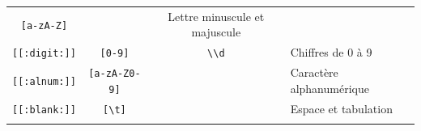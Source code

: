 \documentclass[
  11pt,
]{book}
\numberwithin{equation}{section}
\numberwithin{countremarque}{section}
\begin{document}
\begin{longtable}[]{@{}cccl@{}}
\begin{minipage}[t]{0.21\columnwidth}
\texttt{{[}a-zA-Z{]}}\strut
\end{minipage} & \begin{minipage}[t]{0.21\columnwidth}\centering
\strut
\end{minipage} & \begin{minipage}[t]{0.29\columnwidth}\raggedright
Lettre minuscule et majuscule\strut
\end{minipage}\tabularnewline
\begin{minipage}[t]{0.17\columnwidth}\centering
\texttt{{[}{[}:digit:{]}{]}}\strut
\end{minipage} & \begin{minipage}[t]{0.21\columnwidth}\centering
\texttt{{[}0-9{]}}\strut
\end{minipage} & \begin{minipage}[t]{0.21\columnwidth}\centering
\texttt{\textbackslash{}\textbackslash{}d}\strut
\end{minipage} & \begin{minipage}[t]{0.29\columnwidth}\raggedright
Chiffres de 0 à 9\strut
\end{minipage}\tabularnewline
\begin{minipage}[t]{0.17\columnwidth}\centering
\texttt{{[}{[}:alnum:{]}{]}}\strut
\end{minipage} & \begin{minipage}[t]{0.21\columnwidth}\centering
\texttt{{[}a-zA-Z0-9{]}}\strut
\end{minipage} & \begin{minipage}[t]{0.21\columnwidth}\centering
\strut
\end{minipage} & \begin{minipage}[t]{0.29\columnwidth}\raggedright
Caractère alphanumérique\strut
\end{minipage}\tabularnewline
\begin{minipage}[t]{0.17\columnwidth}\centering
\texttt{{[}{[}:blank:{]}{]}}\strut
\end{minipage} & \begin{minipage}[t]{0.21\columnwidth}\centering
\texttt{{[}\textbackslash{}t{]}}\strut
\end{minipage} & \begin{minipage}[t]{0.21\columnwidth}\centering
\strut
\end{minipage} & \begin{minipage}[t]{0.29\columnwidth}\raggedright
Espace et tabulation\strut
\end{minipage}\tabularnewline
\begin{minipage}[t]{0.17\columnwidth}\centering

\end{minipage}
\end{longtable}
\end{document}
